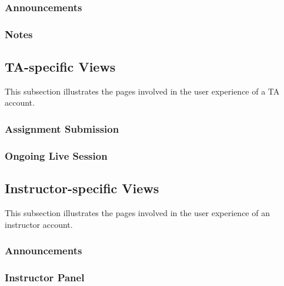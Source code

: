 \documentclass[a4paper, 12pt]{article}
\begin{document}
    
    \subsubsection{Announcements}
    
    
    \subsubsection{Notes}
    
    
    
    \subsection{TA-specific Views}
    
    This subsection illustrates the pages involved in the user experience of a TA account.
    
    \subsubsection{Assignment Submission}
    
    
    \subsubsection{Ongoing Live Session}
    
    
    
    \subsection{Instructor-specific Views}
    
    This subsection illustrates the pages involved in the user experience of an instructor account.
    
    \subsubsection{Announcements}
    
    
    \subsubsection{Instructor Panel}
    
    
\end{document}
